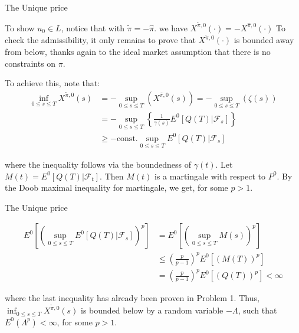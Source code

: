 \documentclass{beamer}
\begin{document}
\begin{frame}{The Unique price}

    {\footnotesize \footnotesize
    \par To show \( u_0 \in L \), notice that with $\tilde{\pi} = -\hat{\pi}$. we have $X^{\tilde{\pi},0}(\cdot) = -X^{\hat{\pi},0}(\cdot)$
    To check the admissibility, it only remains to prove that \( X^{\tilde{\pi},0}(\cdot) \) is bounded 
    away from below, thanks again to the ideal market assumption that there is no constraints on \(\pi\). 
    \par To achieve this, note that:
    \begin{align*}
        \inf_{0 \leq s \leq T} X^{\tilde{\pi},0}(s) &= -\sup_{0 \leq s \leq T} (X^{\hat{\pi},0}(s)) = -\sup_{0 \leq s \leq T} (\zeta(s)) \\
    &= -\sup_{0 \leq s \leq T} \left\{ \frac{1}{\gamma(s)} E^0[Q(T) | \mathcal{F}_s] \right\} \\
    &\geq -\text{const.} \sup_{0 \leq s \leq T} E^0[Q(T) | \mathcal{F}_s]
    \end{align*}
    \par where the inequality follows via the boundedness of \(\gamma(t)\). Let $M(t) = E^0[Q(T) | \mathcal{F}_t].$ Then \( M(t) \) is
     a martingale with respect to \( P^0 \). By the Doob maximal inequality for martingale, we get, for some \( p > 1 \).
    }

\end{frame}
\begin{frame}{The Unique price}

    {\footnotesize \footnotesize
    \begin{align*}
E^0 \left[ \left( \sup_{0 \leq s \leq T} E^0[Q(T) | \mathcal{F}_s] \right)^p \right] &=
E^0 \left[ \left( \sup_{0 \leq s \leq T} M(s) \right)^p \right] \\
&\leq \left( \frac{p}{p-1} \right)^p E^0[(M(T))^p] \\
&= \left( \frac{p}{p-1} \right)^p E^0[(Q(T))^p] < \infty
\end{align*}

where the last inequality has already been proven in Problem 1. Thus, \(\inf_{0 \leq s \leq T} X^{\tilde{\pi},0}(s)\) is 
bounded below by a random variable \(-\Lambda\), such that \( E^0(\Lambda^p) < \infty \), for some \( p > 1 \).
    }

\end{frame}
\end{document}
